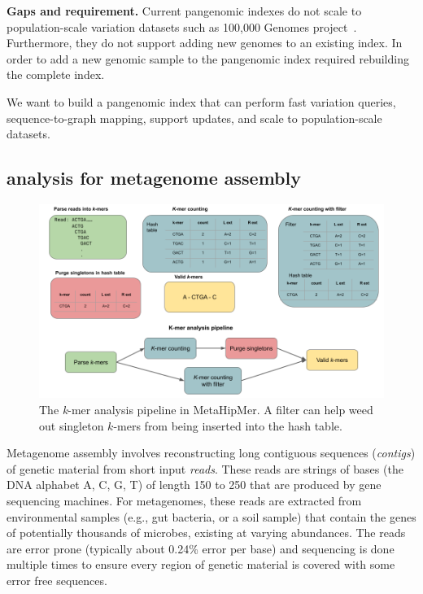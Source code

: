 \noindent
{\bf Gaps and requirement.}
Current pangenomic indexes do not scale to population-scale variation datasets such as 100,000 Genomes project~\cite{1002021100}. Furthermore, they do not support adding new genomes to an existing index. In order to add a new genomic sample to the pangenomic index required rebuilding the complete index.

\begin{rproblem}
 We want to build a pangenomic index that can perform fast variation queries, sequence-to-graph mapping, support updates, and scale to population-scale datasets.
\label{rprob:peppermint3}
\end{rproblem}

\subsection{\kmer analysis for metagenome assembly}


\begin{figure}
    \centering
    \includegraphics[width=0.9\linewidth]{images/mhm-pipeline.png}
    \caption{The \textit{k}-mer analysis pipeline in MetaHipMer. A filter can help weed out singleton $k$-mers from being inserted into the hash table.}
    \vspace{-0.5em}
    \label{fig:mhm-kmer}
\end{figure}

Metagenome assembly involves reconstructing long contiguous sequences ({\it contigs}) of genetic material from short input {\it reads}. These reads are strings of bases (the DNA alphabet A, C, G, T) of length 150 to 250 that are produced by gene sequencing machines.  For metagenomes, these reads are extracted from environmental samples (e.g., gut bacteria, or a soil sample) that contain the genes of potentially thousands of microbes, existing at varying abundances.  The reads are error prone (typically about 0.24\% error per base) and sequencing is done multiple times to ensure every region of genetic material is covered with some error free sequences.

